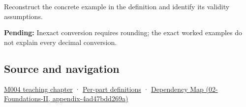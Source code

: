 Reconstruct the concrete example in the definition and identify its validity assumptions.

\textbf{Pending:} Inexact conversion requires rounding; the exact worked examples do not explain every decimal conversion.

\subsection{Source and navigation}\label{source-and-navigation}

\href{Continuous\%20Notes/Computing\%20Foundations\%20-\%20From\%20Bits\%20to\%20C++\%20and\%20Systems\%20APIs\#A\%20stretching\%20ruler\%20for\%20real-valued\%20quantities}{M004 teaching chapter} · \hyperref[appendix-fd090d982a15]{Per-part definitions} · \href{}{Dependency Map (02-Foundations-II, appendix-4ad47bdd269a)}
